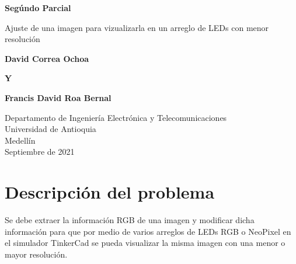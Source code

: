 \documentclass{article}
\begin{document}
\begin{titlepage}
    \begin{center}
        \vspace*{1cm}
            
        \Huge
        \textbf{Segúndo Parcial}
            
        \vspace{0.5cm}
        \LARGE
        Ajuste de una imagen para vizualizarla en un arreglo de LEDs con menor resolución
            
        \vspace{1.5cm}
            
        \textbf{David Correa Ochoa} 
        
        \vspace{0.8cm}
        
        \textbf{Y}
        
        \vspace{0.8cm}
        
        \textbf{Francis David Roa Bernal}
        \vfill
            
        \vspace{0.8cm}
            
        \Large
        Departamento de Ingeniería Electrónica y Telecomunicaciones\\
        Universidad de Antioquia\\
        Medellín\\
        Septiembre de 2021
            
    \end{center}
\end{titlepage}

\tableofcontents
\newpage
\section{Descripción del problema}\label{intro}
Se debe extraer la información RGB de una imagen y modificar dicha información para que por medio de varios arreglos de LEDs RGB o NeoPixel en el simulador TinkerCad se pueda visualizar la misma imagen con una menor o mayor resolución.
\end{document}
